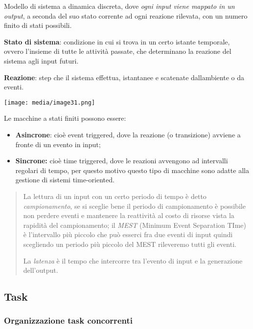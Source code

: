 Modello di sistema a dinamica discreta, dove \emph{ogni input viene
mappato in un output}, a seconda del suo stato corrente ad ogni reazione
rilevata, con un numero finito di stati possibili.

\textbf{Stato di sistema}: condizione in cui si trova in un certo
istante temporale, ovvero l'insieme di tutte le attività passate, che
determinano la reazione del sistema agli input futuri.

\textbf{Reazione}: step che il sistema effettua, istantanee e scatenate
dall\textquotesingle ambiente o da eventi.

\texttt{[image: media/image31.png]}

Le macchine a stati finiti possono essere:

\begin{itemize}
\item
  \textbf{Asincrone}: cioè event triggered, dove la reazione (o
  transizione) avviene a fronte di un evento in input;
\item
  \textbf{Sincrone:} cioè time triggered, dove le reazioni avvengono ad
  intervalli regolari di tempo, per questo motivo questo tipo di
  macchine sono adatte alla gestione di sistemi time-oriented.
\end{itemize}

\begin{quote}
La lettura di un input con un certo periodo di tempo è detto
\emph{campionamento}, se si sceglie bene il periodo di campionamento è
possibile non perdere eventi e mantenere la reattività al costo di
risorse vista la rapidità del campionamento; il \emph{MEST} (Minimum
Event Separation TIme) è l'intervallo più piccolo che può esserci fra
due eventi di input quindi scegliendo un periodo più piccolo del MEST
rileveremo tutti gli eventi.

La \emph{latenza} è il tempo che intercorre tra l'evento di input e la
generazione dell'output.
\end{quote}

\subsection{Task}\label{task}

\subsubsection{Organizzazione task
concorrenti}\label{organizzazione-task-concorrenti}

